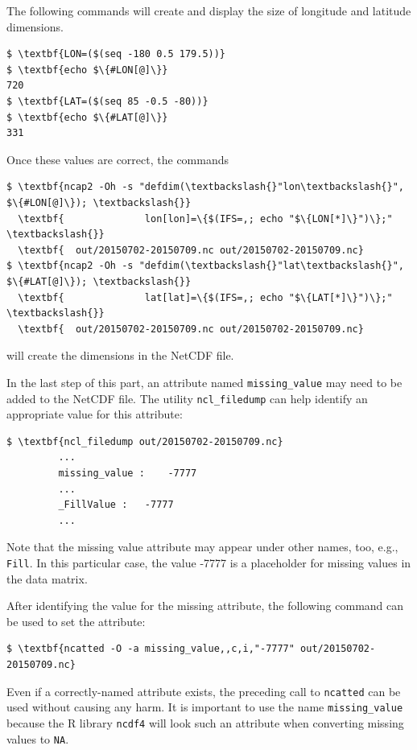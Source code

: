 \documentclass[11pt]{report}
\begin{document}
The following commands will create and display the size of longitude and latitude dimensions.
\begin{Verbatim}[xleftmargin=0.5in,commandchars=\\\{\}]
$ \textbf{LON=($(seq -180 0.5 179.5))}
$ \textbf{echo $\{#LON[@]\}}
720
$ \textbf{LAT=($(seq 85 -0.5 -80))}
$ \textbf{echo $\{#LAT[@]\}}
331
\end{Verbatim}
Once these values are correct, the commands
\begin{Verbatim}[xleftmargin=0.5in,commandchars=\\\{\}]
$ \textbf{ncap2 -Oh -s "defdim(\textbackslash{}"lon\textbackslash{}", $\{#LON[@]\}); \textbackslash{}}
  \textbf{              lon[lon]=\{$(IFS=,; echo "$\{LON[*]\}")\};" \textbackslash{}}
  \textbf{  out/20150702-20150709.nc out/20150702-20150709.nc}
$ \textbf{ncap2 -Oh -s "defdim(\textbackslash{}"lat\textbackslash{}", $\{#LAT[@]\}); \textbackslash{}}
  \textbf{              lat[lat]=\{$(IFS=,; echo "$\{LAT[*]\}")\};" \textbackslash{}}
  \textbf{  out/20150702-20150709.nc out/20150702-20150709.nc}
\end{Verbatim}
will create the dimensions in the NetCDF file.

In the last step of this part, an attribute named \texttt{missing\_value} may need to be added to the NetCDF file.
The utility \texttt{ncl\_filedump} can help identify an appropriate value for this attribute:
\begin{Verbatim}[xleftmargin=0.5in,commandchars=\\\{\}]
$ \textbf{ncl_filedump out/20150702-20150709.nc}
         ...
         missing_value :	-7777
         ...
         _FillValue :	-7777
         ...
\end{Verbatim}
Note that the missing value attribute may appear under other names, too, e.g., \texttt{Fill}.
In this particular case, the value -7777 is a placeholder for missing values in the data matrix.

After identifying the value for the missing attribute, the following command can be used to set the attribute:
\begin{Verbatim}[xleftmargin=0.5in,commandchars=\\\{\}]
$ \textbf{ncatted -O -a missing_value,,c,i,"-7777" out/20150702-20150709.nc}
\end{Verbatim}
Even if a correctly-named attribute exists, the preceding call to \texttt{ncatted} can be used without causing any harm.
It is important to use the name \texttt{missing\_value} because the R library \texttt{ncdf4} will look such an attribute when converting missing values to \lstinline{NA}.
\end{document}
